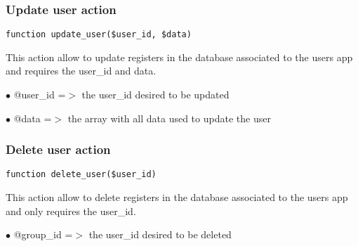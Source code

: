 \documentclass[a4paper]{article}
\begin{document}
\hypertarget{toc194}{}
\subsubsection{Update user action}

\begin{lstlisting}
function update_user($user_id, $data)
\end{lstlisting}

This action allow to update registers in the database associated to
the users app and requires the user\_id and data.

\begin{compactitem}
\item[\color{myblue}$\bullet$] @user\_id =$>$ the user\_id desired to be updated
\item[\color{myblue}$\bullet$] @data    =$>$ the array with all data used to update the user
\end{compactitem}

\hypertarget{toc195}{}
\subsubsection{Delete user action}

\begin{lstlisting}
function delete_user($user_id)
\end{lstlisting}

This action allow to delete registers in the database associated to
the users app and only requires the user\_id.

\begin{compactitem}
\item[\color{myblue}$\bullet$] @group\_id =$>$ the user\_id desired to be deleted
\end{compactitem}

\end{document}
